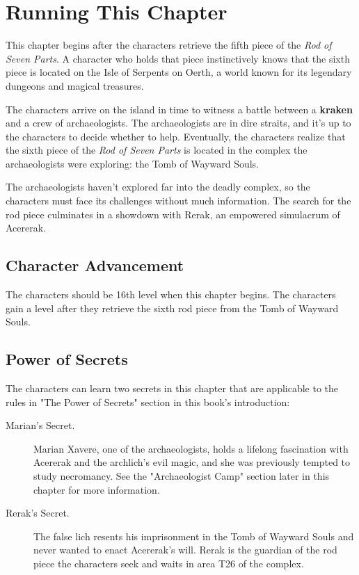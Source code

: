\documentclass[10pt,a4paper,twoside,bg=print,twocolumn,openany,nodeprecatedcode]{dndbook}
\begin{document}
\section{Running This Chapter}
This chapter begins after the characters retrieve the fifth piece of the \textit{Rod of Seven Parts}. A character who holds that piece instinctively knows that the sixth piece is located on the Isle of Serpents on Oerth, a world known for its legendary dungeons and magical treasures.

The characters arrive on the island in time to witness a battle between a \textbf{kraken} and a crew of archaeologists. The archaeologists are in dire straits, and it's up to the characters to decide whether to help. Eventually, the characters realize that the sixth piece of the \textit{Rod of Seven Parts} is located in the complex the archaeologists were exploring: the Tomb of Wayward Souls.

The archaeologists haven't explored far into the deadly complex, so the characters must face its challenges without much information. The search for the rod piece culminates in a showdown with Rerak, an empowered simulacrum of Acererak.

\subsection{Character Advancement}
The characters should be 16th level when this chapter begins. The characters gain a level after they retrieve the sixth rod piece from the Tomb of Wayward Souls.

\subsection{Power of Secrets}
The characters can learn two secrets in this chapter that are applicable to the rules in "The Power of Secrets" section in this book's introduction:


\begin{description}
\item[Marian's Secret.]
Marian Xavere, one of the archaeologists, holds a lifelong fascination with Acererak and the archlich's evil magic, and she was previously tempted to study necromancy. See the "Archaeologist Camp" section later in this chapter for more information.
\item[Rerak's Secret.]
The false lich resents his imprisonment in the Tomb of Wayward Souls and never wanted to enact Acererak's will. Rerak is the guardian of the rod piece the characters seek and waits in area T26 of the complex.
\end{description}
\end{document}
